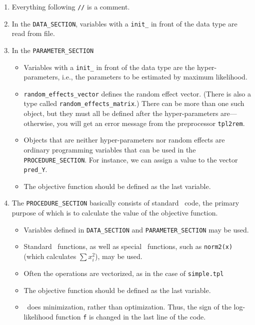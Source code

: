 \documentclass{admbmanual}
\begin{document}
\begin{enumerate}
  \item Everything following \texttt{//} is a comment.

  \item In the \texttt{DATA\_SECTION}, variables with a \texttt{init\_} in front
  of the data type are read from file.

  \item In the \texttt{PARAMETER\_SECTION}
  \begin{itemize}
    \item Variables with a \texttt{init\_} in front of the data type are the
    hyper-parameters, i.e., the parameters to be estimated by maximum
    likelihood.

    \item \texttt{random\_effects\_vector} defines the random effect vector.
    (There is also a type called \texttt{random\_effects\_matrix}.) There can be
    more than one such object, but they must all be defined after the
    hyper-parameters are---otherwise, you will get an error message from the
    preprocessor \texttt{tpl2rem}.

    \item Objects that are neither hyper-parameters nor random effects are
    ordinary programming variables that can be used in the
    \texttt{PROCEDURE\_SECTION}. For instance, we can assign a value to the
    vector \texttt{pred\_Y}.

    \item The objective function should be defined as the last variable.
  \end{itemize}

  \item The \texttt{PROCEDURE\_SECTION} basically consists of standard \cplus\
  code, the primary purpose of which is to calculate the value of the objective
  function.
  \begin{itemize}
    \item Variables defined in \texttt{DATA\_SECTION} and
    \texttt{PARAMETER\_SECTION} may be used.

    \item Standard \cplus\ functions, as well as special \scAB\ functions, such
    as \texttt{norm2(x)} (which calculates $\sum x_i^2$), may be used.

    \item Often the operations are vectorized, as in the case of
    \texttt{simple.tpl}

    \item The objective function should be defined as the last variable.

    \item \scAB\ does minimization, rather than optimization. Thus, the sign of
    the log-likelihood function \texttt{f} is changed in the last line of the
    code.
  \end{itemize}
\end{enumerate}
\end{document}

